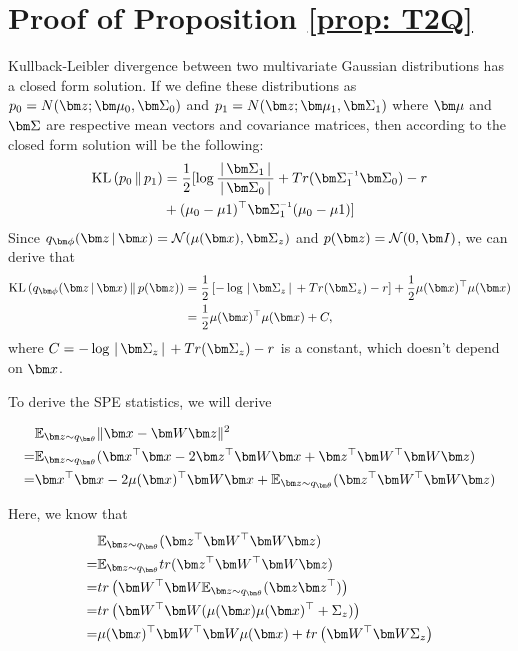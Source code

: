 \documentclass[journal, peerreview]{IEEEtran}
\begin{document}
\section{Proof of Proposition \ref{prop: T2Q}}
\label{sec:PoofOfPropTQ}
Kullback-Leibler divergence between two multivariate Gaussian distributions has a closed form solution. 
If we define these distributions as $p_{0} = N(\mbz;\mbmu_{0}, \mbSigma_{0})$ and $p_{1} = N(\mbz;\mbmu_{1}, \mbSigma_{1})$ where $\mbmu$ and $\mbSigma$ are respective mean vectors and covariance matrices, then according to \cite{hershey2007approximating} the closed form solution will be the following:
\begin{align*}
\KL{p_{0}}{p_{1}} & =\frac{1}{2}[\log\frac{\g\mbSigma_{1}\g}{\g\mbSigma_{0}\g}+Tr(\mbSigma_{1}\inv\mbSigma_{0})-r \\
 & +(\mu_{0}-\mu{1})^{\top}\mbSigma_{1}\inv(\mu_{0}-\mu{1}) ]
\end{align*}
Since $\encoding =\Norm(\mu(\mbx),\mbSigma_z)$ and $p(\mbz) = \Norm(0,\mbI)$, we can derive that 
\begin{align*}
\KL{\encoding}{p(\mbz)} &= \frac{1}{2}\left[ -\log\g\mbSigma_z\g + Tr(\mbSigma_z) -r \right] + \frac{1}{2} \mu(\mbx)^{\top}\mu(\mbx) \\
						&= \frac{1}{2} \mu(\mbx)^{\top}\mu(\mbx) + C,
\end{align*}
where $C = -\log\g\mbSigma_z\g + Tr(\mbSigma_z) -r $ is a constant, which doesn't depend on $\mbx$. 

To derive the SPE statistics, we will derive
  
\begin{align}
 & \mathbb{E}_{\mbz\sim q_{\mbtheta}}\|\mbx-\mbW\mbz\|^{2} \nonumber\\ 
= & \mathbb{E}_{\mbz\sim q_{\mbtheta}}(\mbx^{\top}\mbx-2\mbz^{\top}\mbW\mbx+\mbz^{\top}\mbW^{\top}\mbW\mbz) \nonumber \\
= & \mbx^{\top}\mbx-2\mu(\mbx)^{\top}\mbW\mbx+\mathbb{E}_{\mbz\sim q_{\mbtheta}}(\mbz^{\top}\mbW^{\top}\mbW\mbz)
\label{eq: spew}
\end{align}

Here, we know that 
\begin{align}
 & \mathbb{E}_{\mbz\sim q_{\mbtheta}}(\mbz^{\top}\mbW^{\top}\mbW\mbz)\nonumber \\
= & \mathbb{E}_{\mbz\sim q_{\mbtheta}}tr(\mbz^{\top}\mbW^{\top}\mbW\mbz)\nonumber \\
= & tr\left(\mbW^{\top}\mbW\mathbb{E}_{\mbz\sim q_{\mbtheta}}(\mbz\mbz^{\top})\right)\nonumber \\
= & tr\left(\mbW^{\top}\mbW(\mu(\mbx)\mu(\mbx)^{\top}+\Sigma_{z})\right) \nonumber \\
= & \mu(\mbx)^{\top}\mbW^{\top}\mbW\mu(\mbx)+tr\left(\mbW^{\top}\mbW\Sigma_{z}\right) 
\label{eq: tracezwwz}
\end{align}
\end{document}
